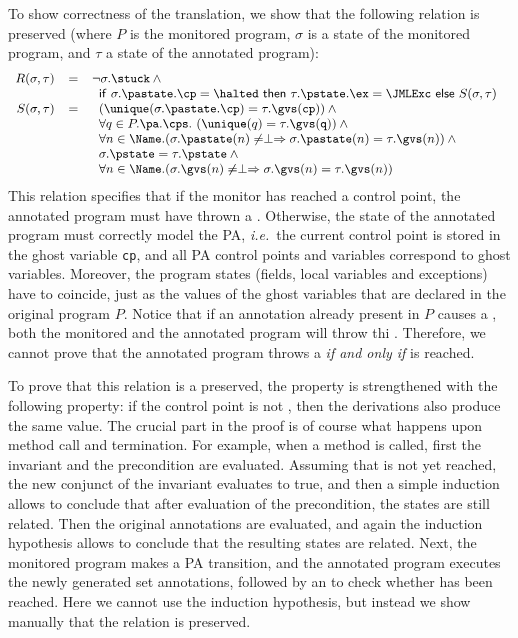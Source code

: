 To show correctness of the translation, we show that the following
relation is preserved (where \(P\) is the monitored program,
\(\sigma\) is a state of the monitored program, and \(\tau\) a state
of the annotated program):
\[{\small
\begin{array}{rcl}
R(\sigma, \tau) & = & \neg \sigma.\stuck \:\wedge\\
& & \begin{array}[t]{l}
\mathsf{if\ }\sigma.\pastate.\cp = \halted
\mathsf{\ then\ }\tau.\pstate.\ex = \JMLExc
\mathsf{\ else\ }S(\sigma, \tau)
\end{array}\\
S(\sigma, \tau) & = &
\begin{array}[t]{l}
(\unique(\sigma.\pastate.\cp) = \tau.\gvs(\texttt{cp})) \:\wedge\\
\forall q \in P.\pa.\cps.\ (\unique(q) = \tau.\gvs(\texttt{q})) \:\wedge\\
\forall n \in \Name. (\sigma.\pastate(n) \not= \perp \Rightarrow
\sigma.\pastate(n) = \tau.\gvs(n)) \:\wedge\\
\sigma.\pstate = \tau.\pstate \:\wedge\\
\forall n \in \Name. (\sigma.\gvs(n) \not= \perp \Rightarrow
\sigma.\gvs(n) = \tau.\gvs(n))
\end{array}
\end{array}}
\]
This relation specifies that if the monitor has reached a \halted
control point, the annotated program must have thrown a
\JMLExc. Otherwise, the state of the annotated program must correctly
model the PA, \emph{i.e.}\ the current control point is stored in the
ghost variable \texttt{cp}, and all PA control points and variables
correspond to ghost variables. Moreover, the program states (fields,
local variables and exceptions) have to coincide, just as the values
of the ghost variables that are declared in the original program
\(P\). Notice that if an annotation already present in \(P\)
causes a \JMLExc, both the monitored and the annotated program will
throw thi \JMLExc.  Therefore, we cannot prove that the annotated
program throws a \JMLExc \emph{if and only if} \halted is reached.

To prove that this relation is a preserved, the property is
strengthened with the following property: if the control point is not
\halted, then the derivations also produce the same value. The crucial
part in the proof is of course what happens upon method call and
termination. For example, when a method is called, first the invariant
and the precondition are evaluated. Assuming that \halted is not yet
reached, the new conjunct of the invariant evaluates to true, and then
a simple induction allows to conclude that after evaluation of the
precondition, the states are still related. Then the original \preset
annotations are evaluated, and again the induction hypothesis allows to
conclude that the resulting states are related. Next, the monitored
program makes a PA transition, and the annotated program executes
the newly generated set annotations, followed by an \Assert to check
whether \halted has been reached. Here we cannot use the induction
hypothesis, but instead we show manually that the relation is
preserved.

